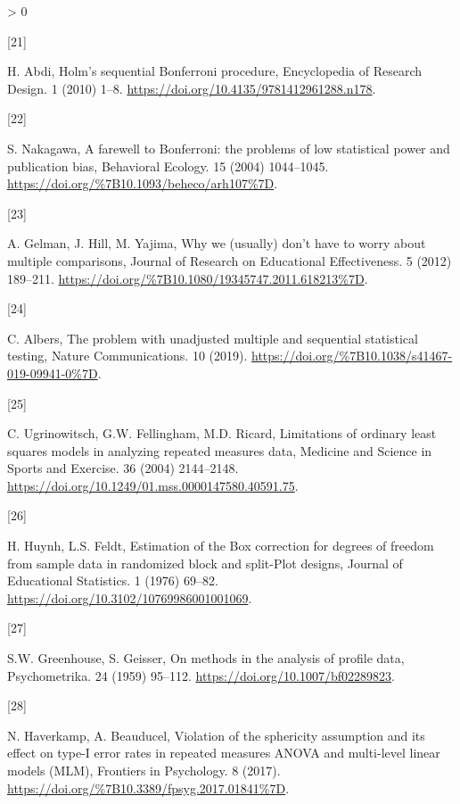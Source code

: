 \documentclass[
]{article}
\newlength{\cslhangindent}
\newlength{\csllabelwidth}
\newenvironment{CSLReferences}[2] %
 {%
  \setlength{\parindent}{0pt}
  \ifodd #1 \everypar{\setlength{\hangindent}{\cslhangindent}}\ignorespaces\fi
  \ifnum #2 > 0
  \setlength{\parskip}{#2\baselineskip}
  \fi
 }%
 {}
\newcommand{\CSLLeftMargin}[1]{\parbox[t]{\csllabelwidth}{#1}}
\newcommand{\CSLRightInline}[1]{\parbox[t]{\linewidth - \csllabelwidth}{#1}\break}
\begin{document}
\begin{CSLReferences}{0}{0}
\leavevmode\hypertarget{ref-abdi2010}{}%
\CSLLeftMargin{{[}21{]} }
\CSLRightInline{H. Abdi, {Holm's sequential Bonferroni procedure}, Encyclopedia of Research Design. 1 (2010) 1--8. \url{https://doi.org/10.4135/9781412961288.n178}.}

\leavevmode\hypertarget{ref-nakagawa2004}{}%
\CSLLeftMargin{{[}22{]} }
\CSLRightInline{S. Nakagawa, {A farewell to Bonferroni: the problems of low statistical power and publication bias}, {Behavioral Ecology}. {15} (2004) 1044--1045. \url{https://doi.org/\%7B10.1093/beheco/arh107\%7D}.}

\leavevmode\hypertarget{ref-gelman2012}{}%
\CSLLeftMargin{{[}23{]} }
\CSLRightInline{A. Gelman, J. Hill, M. Yajima, {Why we (usually) don't have to worry about multiple comparisons}, {Journal of Research on Educational Effectiveness}. {5} (2012) 189--211. \url{https://doi.org/\%7B10.1080/19345747.2011.618213\%7D}.}

\leavevmode\hypertarget{ref-albers2019}{}%
\CSLLeftMargin{{[}24{]} }
\CSLRightInline{C. Albers, {The problem with unadjusted multiple and sequential statistical testing}, {Nature Communications}. {10} (2019). \url{https://doi.org/\%7B10.1038/s41467-019-09941-0\%7D}.}

\leavevmode\hypertarget{ref-ugrinowitsch2004}{}%
\CSLLeftMargin{{[}25{]} }
\CSLRightInline{C. Ugrinowitsch, G.W. Fellingham, M.D. Ricard, Limitations of ordinary least squares models in analyzing repeated measures data, Medicine and Science in Sports and Exercise. 36 (2004) 2144--2148. \url{https://doi.org/10.1249/01.mss.0000147580.40591.75}.}

\leavevmode\hypertarget{ref-huynh1976}{}%
\CSLLeftMargin{{[}26{]} }
\CSLRightInline{H. Huynh, L.S. Feldt, {Estimation of the Box correction for degrees of freedom from sample data in randomized block and split-Plot designs}, Journal of Educational Statistics. 1 (1976) 69--82. \url{https://doi.org/10.3102/10769986001001069}.}

\leavevmode\hypertarget{ref-greenhouse1959}{}%
\CSLLeftMargin{{[}27{]} }
\CSLRightInline{S.W. Greenhouse, S. Geisser, On methods in the analysis of profile data, Psychometrika. 24 (1959) 95--112. \url{https://doi.org/10.1007/bf02289823}.}

\leavevmode\hypertarget{ref-haverkamp2017}{}%
\CSLLeftMargin{{[}28{]} }
\CSLRightInline{N. Haverkamp, A. Beauducel, {Violation of the sphericity assumption and its effect on type-I error rates in repeated measures ANOVA and multi-level linear models (MLM)}, {Frontiers in Psychology}. {8} (2017). \url{https://doi.org/\%7B10.3389/fpsyg.2017.01841\%7D}.}


\end{CSLReferences}
\end{document}
